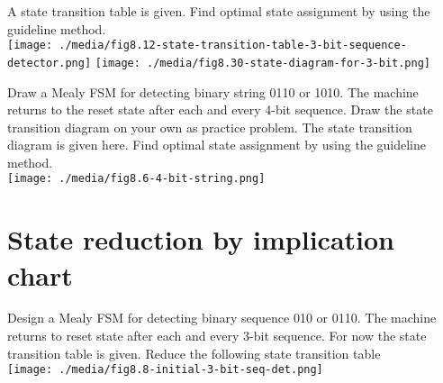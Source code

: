 \begin{example}
  A state transition table is given. Find optimal state assignment by using the
  guideline method.\\
  \texttt{[image: ./media/fig8.12-state-transition-table-3-bit-sequence-detector.png]}%
  \texttt{[image: ./media/fig8.30-state-diagram-for-3-bit.png]}
\end{example}

\begin{example}
  Draw a Mealy FSM for detecting binary string 0110 or 1010. The machine returns
  to the reset state after each and every 4-bit sequence. Draw the state
  transition diagram on your own as practice problem. The state transition
  diagram is given here. Find optimal state assignment by using the guideline method.\\
  \texttt{[image: ./media/fig8.6-4-bit-string.png]}
\end{example}



\section{State reduction by implication chart}

\begin{example}
  Design a Mealy FSM for detecting binary sequence 010 or 0110. The machine
  returns to reset state after each and every 3-bit sequence. For now the state
  transition table is given.
  Reduce the following state transition table \\
  \texttt{[image: ./media/fig8.8-initial-3-bit-seq-det.png]}
\end{example}
\newpage


